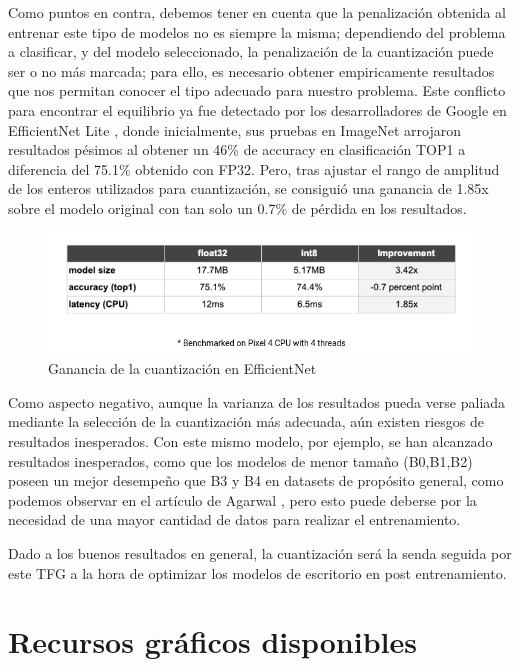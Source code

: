 Como puntos en contra, debemos tener en cuenta que la penalización obtenida al entrenar este tipo de modelos no es siempre la misma; dependiendo del problema a clasificar, y del modelo seleccionado, la penalización de la cuantización puede ser o no más marcada; para ello, es necesario obtener empiricamente resultados que nos permitan conocer el tipo adecuado para nuestro problema. Este conflicto para encontrar el equilibrio ya fue detectado por los desarrolladores de Google en EfficientNet Lite \cite{eflite,eflite2}, donde inicialmente, sus pruebas en ImageNet arrojaron resultados pésimos al obtener un 46\% de accuracy en clasificación TOP1 a diferencia del 75.1\% obtenido con FP32. Pero, tras ajustar el rango de amplitud de los enteros utilizados para cuantización, se consiguió una ganancia de 1.85x sobre el modelo original con tan solo un 0.7\% de pérdida en los resultados.

\begin{figure}[H]
	\label{gananciacuant}
	\centering
	\includegraphics[scale = 0.35]{imagenes/gananciacuant.png}
	\caption{Ganancia de la cuantización en EfficientNet}
\end{figure}

Como aspecto negativo, aunque la varianza de los resultados pueda verse paliada mediante la selección de la cuantización más adecuada, aún existen riesgos de resultados inesperados. Con este mismo modelo, por ejemplo, se han alcanzado resultados inesperados, como que los modelos de menor tamaño (B0,B1,B2) poseen un mejor desempeño que B3 y B4 en datasets de propósito general, como podemos observar en el artículo de Agarwal  \cite{}, pero esto puede deberse por la necesidad de una mayor cantidad de datos para realizar el entrenamiento.

Dado a los buenos resultados en general, la cuantización será la senda seguida por este TFG a la hora de optimizar los modelos de escritorio en post entrenamiento.



\section{Recursos gráficos disponibles}

